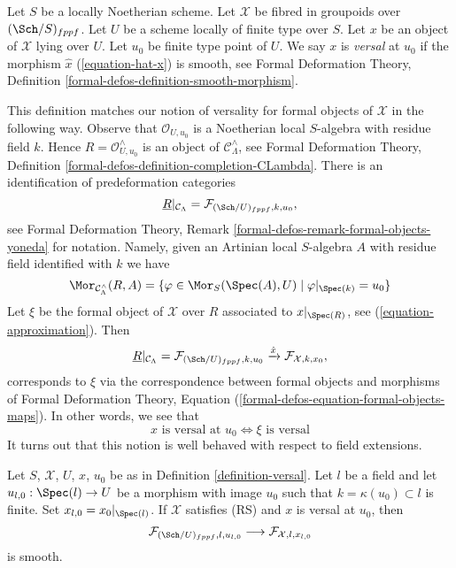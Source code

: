 \begin{definition}
\label{definition-versal}
Let $S$ be a locally Noetherian scheme.
Let $\mathcal{X}$ be fibred in groupoids over $(\Sch/S)_{fppf}$.
Let $U$ be a scheme locally of finite type over $S$.
Let $x$ be an object of $\mathcal{X}$ lying over $U$.
Let $u_0$ be finite type point of $U$.
We say $x$ is {\it versal} at $u_0$ if the morphism $\hat x$
(\ref{equation-hat-x}) is smooth, see Formal Deformation Theory, Definition
\ref{formal-defos-definition-smooth-morphism}.
\end{definition}

\noindent
This definition matches our notion of versality for formal objects of
$\mathcal{X}$ in the following way. Observe that $\mathcal{O}_{U, u_0}$ is a
Noetherian local $S$-algebra with residue field $k$. Hence
$R = \mathcal{O}_{U, u_0}^\wedge$ is an object of
$\mathcal{C}_\Lambda^\wedge$, see Formal Deformation Theory, Definition
\ref{formal-defos-definition-completion-CLambda}.
There is an identification of predeformation categories
$$
\underline{R}|_{\mathcal{C}_\Lambda}
=
\mathcal{F}_{(\Sch/U)_{fppf}, k, u_0},
$$
see Formal Deformation Theory, Remark
\ref{formal-defos-remark-formal-objects-yoneda} for notation.
Namely, given an Artinian local $S$-algebra $A$ with residue field
identified with $k$ we have
$$
\Mor_{\mathcal{C}_\Lambda^\wedge}(R, A) =
\{ \varphi \in \Mor_S(\Spec(A), U) \mid \varphi|_{\Spec(k)} = u_0\}
$$
Let $\xi$ be the formal object of $\mathcal{X}$
over $R$ associated to $x|_{\Spec(R)}$, see (\ref{equation-approximation}).
Then
$$
\underline{R}|_{\mathcal{C}_\Lambda} =
\mathcal{F}_{(\Sch/U)_{fppf}, k, u_0}
\xrightarrow{\hat x}
\mathcal{F}_{\mathcal{X}, k, x_0},
$$
corresponds to $\xi$ via the correspondence between formal objects and
morphisms of Formal Deformation Theory, Equation
(\ref{formal-defos-equation-formal-objects-maps}).
In other words, we see that
$$
x\text{ is versal at }u_0
\Leftrightarrow
\xi\text{ is versal}
$$
It turns out that this notion is well behaved with respect to field
extensions.

\begin{lemma}
\label{lemma-versal-change-of-field}
Let $S$, $\mathcal{X}$, $U$, $x$, $u_0$ be as in
Definition \ref{definition-versal}. Let $l$ be a field and let
$u_{l, 0} : \Spec(l) \to U$ be a morphism with image $u_0$ such that
$k = \kappa(u_0) \subset l$ is finite. Set $x_{l, 0} = x_0|_{\Spec(l)}$.
If $\mathcal{X}$ satisfies (RS) and $x$ is versal at $u_0$, then
$$
\mathcal{F}_{(\Sch/U)_{fppf}, l, u_{l, 0}}
\longrightarrow
\mathcal{F}_{\mathcal{X}, l, x_{l, 0}}
$$
is smooth.
\end{lemma}

